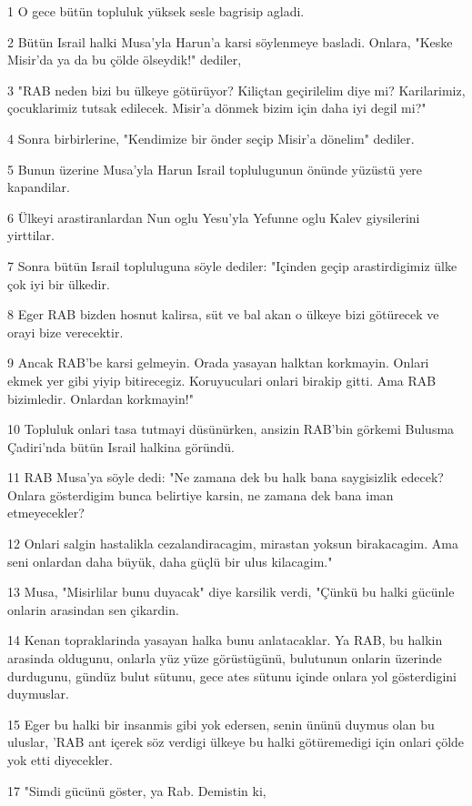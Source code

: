 \par 1 O gece bütün topluluk yüksek sesle bagrisip agladi.
\par 2 Bütün Israil halki Musa'yla Harun'a karsi söylenmeye basladi. Onlara, "Keske Misir'da ya da bu çölde ölseydik!" dediler,
\par 3 "RAB neden bizi bu ülkeye götürüyor? Kiliçtan geçirilelim diye mi? Karilarimiz, çocuklarimiz tutsak edilecek. Misir'a dönmek bizim için daha iyi degil mi?"
\par 4 Sonra birbirlerine, "Kendimize bir önder seçip Misir'a dönelim" dediler.
\par 5 Bunun üzerine Musa'yla Harun Israil toplulugunun önünde yüzüstü yere kapandilar.
\par 6 Ülkeyi arastiranlardan Nun oglu Yesu'yla Yefunne oglu Kalev giysilerini yirttilar.
\par 7 Sonra bütün Israil topluluguna söyle dediler: "Içinden geçip arastirdigimiz ülke çok iyi bir ülkedir.
\par 8 Eger RAB bizden hosnut kalirsa, süt ve bal akan o ülkeye bizi götürecek ve orayi bize verecektir.
\par 9 Ancak RAB'be karsi gelmeyin. Orada yasayan halktan korkmayin. Onlari ekmek yer gibi yiyip bitirecegiz. Koruyuculari onlari birakip gitti. Ama RAB bizimledir. Onlardan korkmayin!"
\par 10 Topluluk onlari tasa tutmayi düsünürken, ansizin RAB'bin görkemi Bulusma Çadiri'nda bütün Israil halkina göründü.
\par 11 RAB Musa'ya söyle dedi: "Ne zamana dek bu halk bana saygisizlik edecek? Onlara gösterdigim bunca belirtiye karsin, ne zamana dek bana iman etmeyecekler?
\par 12 Onlari salgin hastalikla cezalandiracagim, mirastan yoksun birakacagim. Ama seni onlardan daha büyük, daha güçlü bir ulus kilacagim."
\par 13 Musa, "Misirlilar bunu duyacak" diye karsilik verdi, "Çünkü bu halki gücünle onlarin arasindan sen çikardin.
\par 14 Kenan topraklarinda yasayan halka bunu anlatacaklar. Ya RAB, bu halkin arasinda oldugunu, onlarla yüz yüze görüstügünü, bulutunun onlarin üzerinde durdugunu, gündüz bulut sütunu, gece ates sütunu içinde onlara yol gösterdigini duymuslar.
\par 15 Eger bu halki bir insanmis gibi yok edersen, senin ününü duymus olan bu uluslar, 'RAB ant içerek söz verdigi ülkeye bu halki götüremedigi için onlari çölde yok etti diyecekler.
\par 17 "Simdi gücünü göster, ya Rab. Demistin ki,

